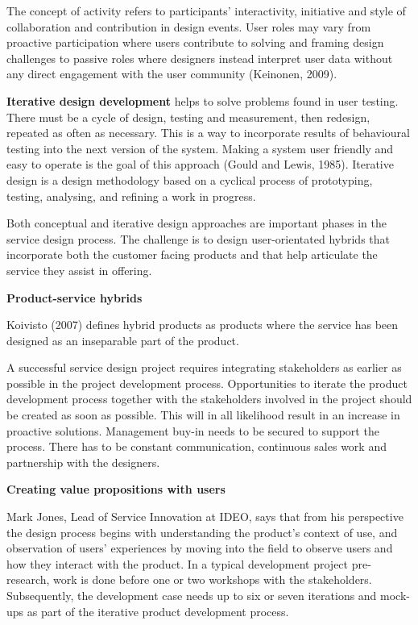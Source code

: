 The concept of activity refers to participants’ interactivity, initiative and style of collaboration and contribution in design events. User roles may vary from proactive participation where users contribute to solving and framing design challenges to passive roles where designers instead interpret user data without any direct engagement with the user community (Keinonen, 2009).

\textbf{Iterative design development} helps to solve problems found in user testing. There must be a cycle of design, testing and measurement, then redesign, repeated as often as necessary. This is a way to incorporate results of behavioural testing into the next version of the system. Making a system user friendly and easy to operate is the goal of this approach (Gould and Lewis, 1985). Iterative design is a design methodology based on a cyclical process of prototyping, testing, analysing, and refining a work in progress.

Both conceptual and iterative design approaches are important phases in the service design process. The challenge is to design user-orientated hybrids that incorporate both the customer facing products and that help articulate the service they assist in offering.

\textbf{Product-service hybrids}

Koivisto (2007) defines hybrid products as products where the service has been designed as an inseparable part of the product. %

A successful service design project requires integrating stakeholders as earlier as possible in the project development process. Opportunities to iterate the product development process together with the stakeholders involved in the project should be created as soon as possible. This will in all likelihood result in an increase in proactive solutions. Management buy-in needs to be secured to support the process. There has to be constant communication, continuous sales work and partnership with the designers.

\textbf{Creating value propositions with users}

Mark Jones, Lead of Service Innovation at IDEO, says that from his perspective the design process begins with understanding the product’s context of use, and observation of users’ experiences by moving into the field to observe users and how they interact with the product. In a typical development project pre-research, work is done before one or two workshops with the stakeholders. Subsequently, the development case needs up to six or seven iterations and mock-ups as part of the iterative product development process.


